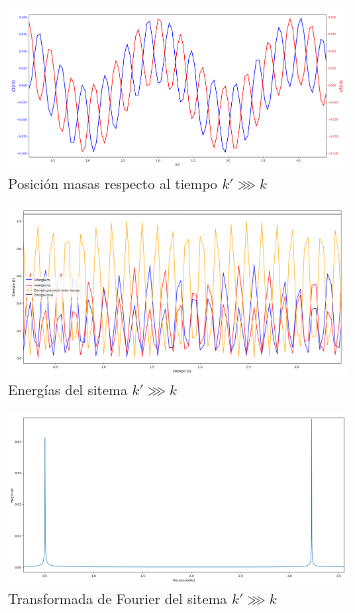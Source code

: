 \documentclass{article}
\begin{document}
\begin{figure}[H]
\centering
\includegraphics[width=0.8\textwidth]{posicion_k_mas_mayor}
\caption{Posición masas respecto al tiempo $k'\ggg k$}
\label{fig:5}
\end{figure}
\begin{figure}[H]
\centering
\includegraphics[width=0.8\textwidth]{energias_k_mas_mayor}
\caption{Energías del sitema $k'\ggg k$}
\label{fig:6}
\end{figure}
\begin{figure}[H]
    \centering
    \includegraphics[width=0.8\textwidth]{fourier_k_mas_mayor}
\caption{Transformada de Fourier del sitema $k'\ggg k$}
\label{fig:f3}
\end{figure}
\end{document}
